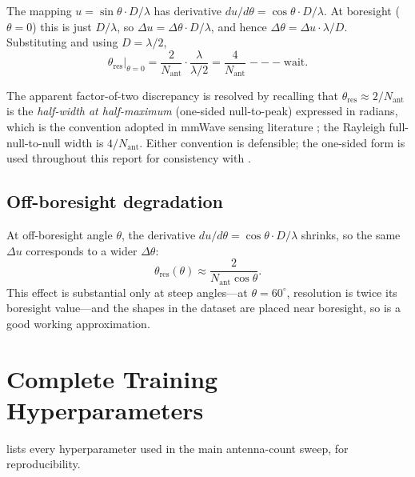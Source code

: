 \documentclass[letterpaper,11pt,leqno]{article}
\begin{document}
The mapping $u = \sin\theta\cdot D/\lambda$ has derivative $du/d\theta = \cos\theta\cdot D/\lambda$. At boresight ($\theta=0$) this is just $D/\lambda$, so $\Delta u = \Delta\theta\cdot D/\lambda$, and hence $\Delta\theta = \Delta u\cdot \lambda/D$. Substituting  and using $D=\lambda/2$,
\begin{equation}\label{e:angres_derived}
\theta_{\mathrm{res}}\bigg|_{\theta=0} = \frac{2}{N_{\mathrm{ant}}}\cdot\frac{\lambda}{\lambda/2} = \frac{4}{N_{\mathrm{ant}}}\;\mathrm{---}\;\mathrm{wait.}
\end{equation}

The apparent factor-of-two discrepancy is resolved by recalling that $\theta_{\mathrm{res}}\approx 2/N_{\mathrm{ant}}$ is the \emph{half-width at half-maximum} (one-sided null-to-peak) expressed in radians, which is the convention adopted in mmWave sensing literature \citep{RaoFMCW}; the Rayleigh full-null-to-null width is $4/N_{\mathrm{ant}}$. Either convention is defensible; the one-sided form is used throughout this report for consistency with .

\subsection{Off-boresight degradation}

At off-boresight angle $\theta$, the derivative $du/d\theta = \cos\theta\cdot D/\lambda$ shrinks, so the same $\Delta u$ corresponds to a wider $\Delta\theta$:
\begin{equation}\label{e:offbore}
\theta_{\mathrm{res}}(\theta) \approx \frac{2}{N_{\mathrm{ant}}\cos\theta}.
\end{equation}
This effect is substantial only at steep angles---at $\theta=60^\circ$, resolution is twice its boresight value---and the shapes in the dataset are placed near boresight, so  is a good working approximation.

\section{Complete Training Hyperparameters}\label{a:hyper}

 lists every hyperparameter used in the main antenna-count sweep, for reproducibility.
\end{document}

